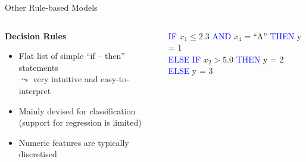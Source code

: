 \documentclass[10pt,compress,t,notes=noshow, xcolor=table]{beamer}
\begin{document}
\begin{frame}[t]{Other Rule-based Models}

\begin{columns}[c, totalwidth=\textwidth]
    \begin{column}{0.6\textwidth}
        \textbf{Decision Rules} 
        \begin{itemize}
            \item Flat list of simple ``if -- then'' statements\\
            $\leadsto$ very intuitive and easy-to-interpret
            \item Mainly devised for classification \\
            (support for regression is limited)
            \item Numeric features are typically discretised
        \end{itemize}
    \end{column}
    \begin{column}{0.4\textwidth}
        \scriptsize
\textcolor{blue}{IF}  $x_{1} \le 2.3$  \textcolor{blue}{AND}  $x_{4} = \text{``A''}$   \hfill\textcolor{blue}{THEN} \hspace{5pt} y = 1\\[2pt]
\textcolor{blue}{ELSE IF}  $x_{2} > 5.0$  \hfill \textcolor{blue}{THEN} \hspace{5pt} y = 2\\[2pt]
\textcolor{blue}{ELSE}  \hfill y = 3
    \end{column}
\end{columns}

\bigskip


\end{frame}
\end{document}
